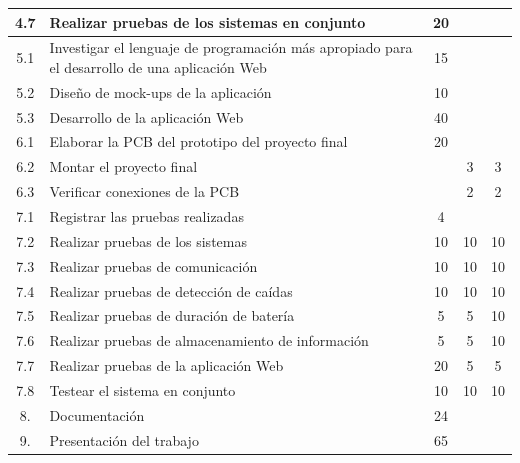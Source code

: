 \documentclass[11pt]{charter}
\begin{document}
\begin{table}[!hbt]
\begin{tabularx}{\linewidth}{@{}|c|X|c|c|c|@{}}
 4.7  & Realizar pruebas de los sistemas en conjunto & 20 &  &   \\ \hline
 5.1  & Investigar el lenguaje de programación más apropiado para el desarrollo de una aplicación Web & 15 &  &   \\ \hline 
 5.2  & Diseño de mock-ups de la aplicación & 10  &  &  \\ \hline
 5.3  & Desarrollo de la aplicación Web & 40 &  &  \\ \hline
 6.1  & Elaborar la PCB del prototipo del proyecto final & 20 & &  \\ \hline
 6.2  & Montar el proyecto final &  & 3 & 3 \\ \hline
 6.3  & Verificar conexiones de la PCB &  & 2 & 2  \\ \hline
 7.1  & Registrar las pruebas realizadas & 4 &  &  \\ \hline
 7.2  & Realizar pruebas de los sistemas & 10  & 10 & 10 \\ \hline
 7.3  & Realizar pruebas de comunicación & 10 & 10 & 10  \\ \hline
 7.4  & Realizar pruebas de detección de caídas & 10 & 10 & 10  \\ \hline
 7.5  & Realizar pruebas de duración de batería & 5 & 5  & 10  \\ \hline 
 7.6  & Realizar pruebas de almacenamiento de información & 5 & 5  & 10  \\ \hline 
 7.7  & Realizar pruebas de la aplicación Web & 20 & 5 & 5 \\ \hline 
 7.8  & Testear el sistema en conjunto & 10 & 10 & 10 \\ \hline 
 8.  & Documentación & 24 &  &   \\ \hline
 9.  & Presentación del trabajo & 65 &  &   \\ \hline 
\end{tabularx}
\end{table}
\end{document}
